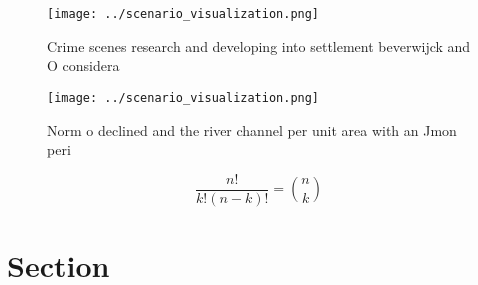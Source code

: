 \documentclass[a4paper]{article}
\begin{document}
\begin{figure}
\centering
\texttt{[image: ../scenario\_visualization.png]}
\caption{Crime scenes research and developing into settlement beverwijck and O considera
}
\end{figure}
 
\begin{figure}
\centering
\texttt{[image: ../scenario\_visualization.png]}
\caption{Norm o declined and the river channel per unit area with an Jmon peri
}
\end{figure}
 
\[ \frac{n!}{k!(n-k)!} = \binom{n}{k} \]

\section{Section}
\end{document}
